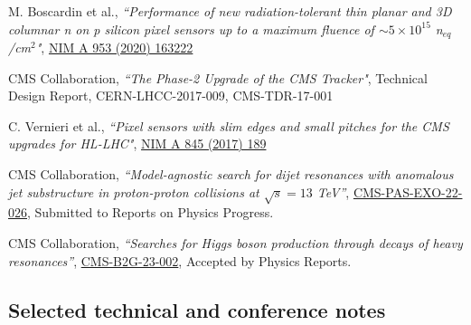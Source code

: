     
     \begin{refsection}
      \vspace{2mm}
      \onehalfspacing
 M. Boscardin et al., {\em ``Performance of new radiation-tolerant thin planar and 3D columnar n on p silicon pixel sensors up to a maximum fluence of $\sim 5 \times 10^{15}$   n$_{eq}$/cm$^2$"}, \href{https://doi.org/10.1016/j.nima.2019.163222}{NIM A 953 (2020) 163222}
     \end{refsection}
     
     
             \begin{refsection}
      \vspace{2mm}
      \onehalfspacing
  CMS Collaboration, {\sl ``The Phase-2 Upgrade of the CMS Tracker"}, Technical Design Report, CERN-LHCC-2017-009, CMS-TDR-17-001
 \end{refsection}
 
         \begin{refsection}
      \vspace{2mm}
      \onehalfspacing

 C. Vernieri et al., {\sl ``Pixel sensors with slim edges and small pitches for the CMS upgrades for HL-LHC"}, \href{http://dx.doi.org/10.1016/j.nima.2016.06.020}{NIM A 845 (2017) 189}

 \end{refsection}

\begin{refsection}
      \vspace{2mm}
      \onehalfspacing
CMS Collaboration, {\sl ``Model-agnostic search for dijet resonances with anomalous jet substructure in proton-proton collisions at $\sqrt{s}=13$ TeV''},
\href{https://cds.cern.ch/record/2892677?ln=en}{CMS-PAS-EXO-22-026},
Submitted to Reports on Physics Progress.
    \end{refsection}  
  
\begin{refsection}
      \vspace{2mm}
      \onehalfspacing
CMS Collaboration, {\sl ``Searches for Higgs boson production through decays of heavy resonances''},
\href{https://cds.cern.ch/record/2892661}{CMS-B2G-23-002},
Accepted by Physics Reports.
    \end{refsection}



\subsection{Selected technical and conference notes}

